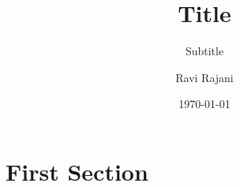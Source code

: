 \documentclass[style=article]{tablet}
\title{Title}
\subtitle{Subtitle}
\author{Ravi Rajani}
\date{\today}
\begin{document}
\def\subbib{}
\maketitle
\section{First Section}
%
\end{document}
